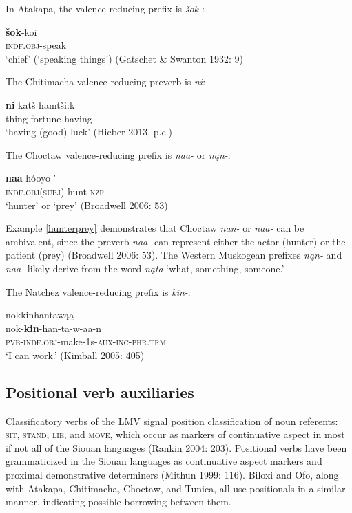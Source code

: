 \documentclass[output=paper]{LSP/langsci}
\begin{document}
	In Atakapa, the valence-reducing prefix is \emph{šok-}:

\ea
\gll	\textbf{šok}-koi\\
		\textsc{indf.obj}-speak \\

\glt	`chief' (`speaking things') (Gatschet \& Swanton 1932: 9)
\z

The Chitimacha valence-reducing preverb is \emph{ni}:

\ea
\gll	\textbf{ni} 	katš hamtši:k \\
	thing fortune having\\

\glt `having (good) luck' (Hieber 2013, p.c.)
\z

	The Choctaw valence-reducing prefix is \emph{naa-} or \emph{nąn-}:
	
\ea\label{hunterprey}
\gll	\textbf{naa}-hóoyo-ʹ~\\
		\textsc{indf.obj(subj)}-hunt-\textsc{nzr}\\
\glt	`hunter' or `prey' (Broadwell 2006: 53)
\z

Example \ref{hunterprey} demonstrates that Choctaw \emph{nan-} or \emph{naa-} can be ambivalent, since the preverb \emph{naa-} can represent either the actor (hunter) or the patient (prey) (Broadwell 2006: 53). The Western Muskogean prefixes \emph{nąn-} and \emph{naa-} likely derive from the word \emph{nąta} `what, something, someone.'
 
	The Natchez valence-reducing prefix is \emph{kin-}:
	
\ea	nokkinhantawąą\\
\gll		nok-\textbf{kin}-han-ta-w-aa-n\\
		\textsc{pvb-indf.obj}-make-1s-\textsc{aux-inc-phr.trm}\\
\glt	`I can work.' (Kimball 2005: 405)
\z

\subsection{Positional verb auxiliaries}

Classificatory verbs of the LMV signal position classification of noun referents: \textsc{sit}, \textsc{stand}, \textsc{lie}, and \textsc{move}, which occur as markers of continuative aspect in most if not all of the Siouan languages (Rankin 2004: 203). Positional verbs have been grammaticized in the Siouan languages as continuative aspect markers and proximal demonstrative determiners (Mithun 1999: 116). Biloxi and Ofo, along with Atakapa, Chitimacha, Choctaw, and Tunica, all use positionals in a similar manner, indicating possible borrowing between them. 
\end{document}
